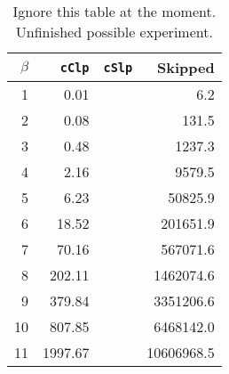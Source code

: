 \begin{table}[ht!]
\centering
\caption{Ignore this table at the moment. Unfinished possible experiment.}
\begin{tabular}{rrrr}
    $\beta$ & \texttt{cClp} & \texttt{cSlp} & Skipped \\ \hline
     1  & 0.01          &               & 6.2 \\
     2  & 0.08          &               & 131.5 \\
     3  & 0.48          &               & 1237.3 \\
     4  & 2.16          &               & 9579.5 \\
     5  & 6.23          &               & 50825.9 \\
     6  & 18.52         &               & 201651.9 \\
     7  & 70.16         &               & 567071.6 \\
     8  & 202.11        &               & 1462074.6 \\
     9  & 379.84        &               & 3351206.6 \\
     10 & 807.85        &               & 6468142.0 \\
     11 & 1997.67       &               & 10606968.5
\end{tabular}
\end{table}
